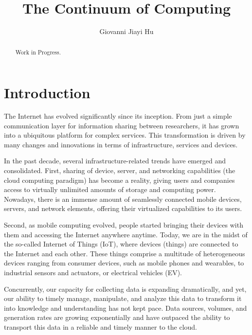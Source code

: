 \documentclass{ieeeaccess}
\begin{document}

\title{The Continuum of Computing}
\author{Giovanni Jiayi Hu}
\address[1]{Department of Mathematics, University of Padua, Italy I-35121}

\begin{abstract}
Work in Progress.
\end{abstract}

\titlepgskip=-15pt

\maketitle

\section{Introduction}
\label{sec:introduction}

The Internet has evolved significantly since its inception. From just a simple communication layer for information sharing between researchers, it has grown into a ubiquitous platform for complex services. This transformation is driven by many changes and innovations in terms of infrastructure, services and devices.

In the past decade, several infrastructure-related trends have emerged and consolidated. First, sharing of device, server, and networking capabilities (the cloud computing paradigm) has become a reality, giving users and companies access to virtually unlimited amounts of storage and computing power. Nowadays, there is an immense amount of seamlessly connected mobile devices, servers, and network elements, offering their virtualized capabilities to its users.

Second, as mobile computing evolved, people started bringing their devices with them and accessing the Internet anywhere anytime. Today, we are in the midst of the so-called Internet of Things (IoT), where devices (things) are connected to the Internet and each other. These things comprise a multitude of heterogeneous devices ranging from consumer devices, such as mobile phones and wearables, to industrial sensors and actuators, or electrical vehicles (EV). 

Concurrently, our capacity for collecting data is expanding dramatically, and yet, our ability to timely manage, manipulate, and analyze this data to transform it into knowledge and understanding has not kept pace. Data sources, volumes, and generation rates are growing exponentially and have outpaced the ability to transport this data in a reliable and timely manner to the cloud.
\end{document}
